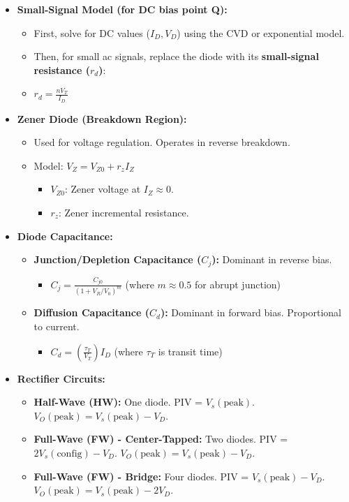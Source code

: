 \documentclass[12pt, letterpaper]{article}
\begin{document}
\begin{itemize}
    \item \textbf{Small-Signal Model (for DC bias point Q):}
    \begin{itemize}
        \item First, solve for DC values ($I_D, V_D$) using the CVD or exponential model.
        \item Then, for small ac signals, replace the diode with its \textbf{small-signal resistance ($r_d$)}:
        \item $r_d = \frac{nV_T}{I_D}$
    \end{itemize}
    
    \item \textbf{Zener Diode (Breakdown Region):}
    \begin{itemize}
        \item Used for voltage regulation. Operates in reverse breakdown.
        \item Model: $V_Z = V_{Z0} + r_z I_Z$
        \begin{itemize}
            \item $V_{Z0}$: Zener voltage at $I_Z \approx 0$.
            \item $r_z$: Zener incremental resistance.
        \end{itemize}
    \end{itemize}
    
    \item \textbf{Diode Capacitance:}
    \begin{itemize}
        \item \textbf{Junction/Depletion Capacitance ($C_j$):} Dominant in reverse bias.
        \begin{itemize}
            \item $C_j = \frac{C_{j0}}{(1 + V_R/V_0)^m}$ (where $m \approx 0.5$ for abrupt junction)
        \end{itemize}
        \item \textbf{Diffusion Capacitance ($C_d$):} Dominant in forward bias. Proportional to current.
        \begin{itemize}
            \item $C_d = \left(\frac{\tau_T}{V_T}\right) I_D$ (where $\tau_T$ is transit time)
        \end{itemize}
    \end{itemize}
    
    \item \textbf{Rectifier Circuits:}
    \begin{itemize}
        \item \textbf{Half-Wave (HW):} One diode. PIV = $V_s(\text{peak})$. $V_O(\text{peak}) = V_s(\text{peak}) - V_D$.
        \item \textbf{Full-Wave (FW) - Center-Tapped:} Two diodes. PIV = $2V_s(\text{config}) - V_D$. $V_O(\text{peak}) = V_s(\text{peak}) - V_D$.
        \item \textbf{Full-Wave (FW) - Bridge:} Four diodes. PIV = $V_s(\text{peak}) - V_D$. $V_O(\text{peak}) = V_s(\text{peak}) - 2V_D$.
    \end{itemize}
    

\end{itemize}
\end{document}
